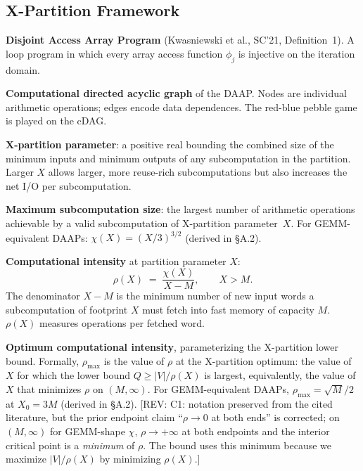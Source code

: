 \documentclass[11pt]{article}
\newcommand{\REV}[1]{\textcolor{blue!60!black}{\small\textsf{[REV: #1]}}}
\begin{document}
\subsection*{X-Partition Framework}

\begin{description}[leftmargin=3.5em, labelwidth=3em, labelsep=0.5em,
                    style=nextline, font=\normalfont\itshape]

\item[DAAP] \textbf{Disjoint Access Array Program} (Kwasniewski et al.,
  SC'21, Definition~1). A loop program in which every array access
  function $\phi_j$ is injective on the iteration domain.

\item[cDAG] \textbf{Computational directed acyclic graph} of the DAAP.
  Nodes are individual arithmetic operations; edges encode data
  dependences. The red-blue pebble game is played on the cDAG.

\item[$X$] \textbf{X-partition parameter}: a positive real bounding the
  combined size of the minimum inputs and minimum outputs of any
  subcomputation in the partition. Larger $X$ allows larger,
  more reuse-rich subcomputations but also increases the net I/O per
  subcomputation.

\item[$\chi(X)$] \textbf{Maximum subcomputation size}: the largest number
  of arithmetic operations achievable by a valid subcomputation of
  X-partition parameter~$X$. For GEMM-equivalent DAAPs:
  $\chi(X) = (X/3)^{3/2}$ (derived in \S A.2).

\item[$\rho(X)$] \textbf{Computational intensity} at partition parameter
  $X$:
  \[
    \rho(X) \;=\; \frac{\chi(X)}{X - M}, \qquad X > M.
  \]
  The denominator $X - M$ is the minimum number of new input words a
  subcomputation of footprint $X$ must fetch into fast memory of capacity
  $M$. $\rho(X)$ measures operations per fetched word.

\item[$\rho_{\max}$] \textbf{Optimum computational intensity},
  parameterizing the X-partition lower bound. Formally,
  $\rho_{\max}$ is the value of $\rho$ at the X-partition optimum:
  the value of $X$ for which the lower bound
  $Q \ge |V|/\rho(X)$ is largest, equivalently, the value of $X$ that
  minimizes $\rho$ on $(M,\infty)$. For GEMM-equivalent DAAPs,
  $\rho_{\max} = \sqrt{M}/2$ at $X_0 = 3M$ (derived in \S A.2).
  \REV{C1: notation preserved from the cited literature, but the
  prior endpoint claim ``$\rho \to 0$ at both ends'' is corrected; on
  $(M,\infty)$ for GEMM-shape $\chi$, $\rho \to +\infty$ at both
  endpoints and the interior critical point is a \emph{minimum} of
  $\rho$. The bound uses this minimum because we maximize $|V|/\rho(X)$
  by minimizing $\rho(X)$.}


\end{description}
\end{document}
